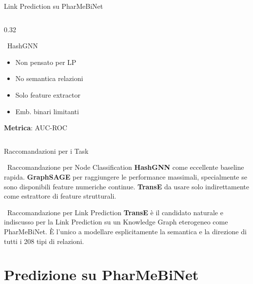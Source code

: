 \documentclass[aspectratio=169]{beamer}
\newcommand{\icoRocket}{\faRocket}
\newcommand{\icoLink}{\faLink}
\newcommand{\icoX}{\faTimesCircle}
\newcommand{\icoRocket}{\ding{224}}
\newcommand{\icoLink}{\ding{212}}
\newcommand{\icoX}{\ding{56}}
\newcommand{\con}{{\color{warningRed}\icoX}}
\newcommand{\neu}{{\color{unigold}$\sim$}}
\begin{document}
\begin{frame}{Link Prediction su PharMeBiNet}
\begin{columns}[T]
\begin{column}{0.32\textwidth}
\begin{block}{\color{hashgnnPurple}\icoLink\ HashGNN}
\begin{itemize}
          \setlength{\itemsep}{1pt}
          \item[\con] Non pensato per LP
          \item[\con] No semantica relazioni
          \item[\neu] Solo feature extractor
          \item[\con] Emb. binari limitanti
        \end{itemize}
        \vspace{2pt}
        {\scriptsize\textbf{Metrica}: AUC-ROC}
      \end{block}
    \end{column}
  \end{columns}
\end{frame}

\begin{frame}{Raccomandazioni per i Task}
  \begin{alertblock}{\icoRocket\ Raccomandazione per Node Classification}
    \small
    \textbf{HashGNN} come eccellente baseline rapida.
    \textbf{GraphSAGE} per raggiungere le performance massimali, specialmente se sono disponibili feature numeriche continue.
    \textbf{TransE} da usare solo indirettamente come estrattore di feature strutturali.
  \end{alertblock}
  \vspace{0.5cm}
  \begin{alertblock}{\icoRocket\ Raccomandazione per Link Prediction}
    \small
    \textbf{TransE} \`e il candidato naturale e indiscusso per la Link Prediction su un Knowledge Graph eterogeneo come PharMeBiNet. \`E l'unico a modellare esplicitamente la semantica e la direzione di tutti i 208 tipi di relazioni.
  \end{alertblock}
\end{frame}

\section{Predizione su PharMeBiNet}
\end{document}

